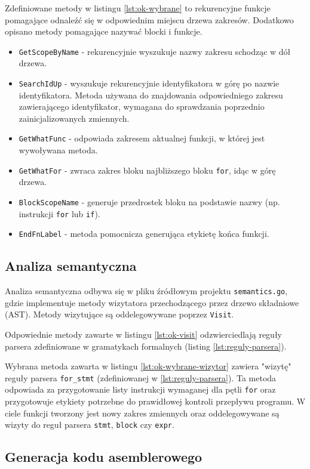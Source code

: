 Zdefiniowane metody w listingu \ref{lst:ok-wybrane} to rekurencyjne funkcje pomagające odnaleźć się w odpowiednim miejscu drzewa zakresów. Dodatkowo opisano metody pomagające nazywać blocki i funkcje.
\begin{itemize}
    \item \verb|GetScopeByName| - rekurencyjnie wyszukuje nazwy zakresu schodząc w dół drzewa.
    \item \verb|SearchIdUp| - wyszukuje rekurencyjnie identyfikatora w górę po nazwie identyfikatora. Metoda używana do znajdowania odpowiedniego zakresu zawierającego identyfikator, wymagana do sprawdzania poprzednio zainicjalizowanych zmiennych.
    \item \verb|GetWhatFunc| - odpowiada zakresem aktualnej funkcji, w której jest wywoływana metoda.
    \item \verb|GetWhatFor| - zwraca zakres bloku najbliższego bloku \verb|for|, idąc w górę drzewa.
    \item \verb|BlockScopeName| - generuje przedrostek bloku na podstawie nazwy (np. instrukcji \verb|for| lub \verb|if|).
    \item \verb|EndFnLabel| - metoda pomocnicza generująca etykietę końca funkcji.
\end{itemize}

\subsection{Analiza semantyczna}

Analiza semantyczna odbywa się w pliku źródłowym projektu \verb|semantics.go|, gdzie implementuje metody wizytatora przechodzącego przez drzewo składniowe (AST). Metody wizytujące są oddelegowywane poprzez \verb|Visit|.

Odpowiednie metody zawarte w listingu \ref{lst:ok-visit} odzwierciedlają reguły parsera zdefiniowane w gramatykach formalnych (listing \ref{lst:reguly-parsera}).

Wybrana metoda zawarta w listingu \ref{lst:ok-wybrane-wizytor} zawiera "wizytę" reguły parsera \verb|for_stmt| (zdefiniowanej w \ref{lst:reguly-parsera}). Ta metoda odpowiada za przygotowanie listy instrukcji wymaganej dla pętli \verb|for| oraz przygotowuje etykiety potrzebne do prawidłowej kontroli przepływu programu. W ciele funkcji tworzony jest nowy zakres zmiennych oraz oddelegowywane są wizyty do reguł parsera \verb|stmt|, \verb|block| czy \verb|expr|.

\subsection{Generacja kodu asemblerowego}

